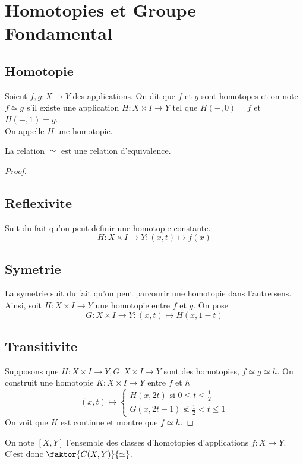 \documentclass[../main.tex]{subfiles}
\begin{document}
\section{Homotopies et Groupe Fondamental}
\subsection{Homotopie}
\begin{defn}
	Soient $f,g: X\to Y$ des applications. On dit que $f$ et $g$ sont homotopes et on note $f\simeq g$ s'il existe une application $H:X\times I\to Y$ tel que $H( -, 0) =f$ et $H( -,1) =g$.\\
	On appelle $H$ une \underline { homotopie}.
\end{defn}
\begin{propo}
La relation $\simeq $ est une relation d'equivalence.
\end{propo}
\begin{proof}
\subsection*{Reflexivite}
Suit du fait qu'on peut definir une homotopie constante.
\[ 
H:X\times I \to Y: ( x,t) \mapsto f( x) 
\]

\subsection*{Symetrie}
La symetrie suit du fait qu'on peut parcourir une homotopie dans l'autre sens.\\
Ainsi, soit $H:X\times I\to Y$ une homotopie entre $f$ et $g$. On pose
\[ 
G:X\times I \to Y : ( x,t) \mapsto H( x,1-t) 
\]

\subsection*{Transitivite}
Supposons que $H:X\times I\to Y, G:X\times I \to Y$ sont des homotopies, $f\simeq g\simeq h$. On construit une homotopie $K :X\times I\to Y$ entre $f$ et $h$ 
\[ 
	( x,t) \mapsto
	\begin{cases}
H( x,2t) \text{ si } 0 \leq t	\leq \frac{1}{2}\\
G( x,2t-1) \text{ si  } \frac{1}{2}< t \leq 1	
	\end{cases}
\]
On voit que $K$ est continue et montre que $f\simeq h$.
\end{proof}
\begin{defn}
On note $ [ X,Y] $ l'ensemble des classes d'homotopies d'applications $f:X\to Y$.\\
C'est donc $\faktor{  C( X,Y) }{\simeq} $.
\end{defn}
		


	
\end{document}
